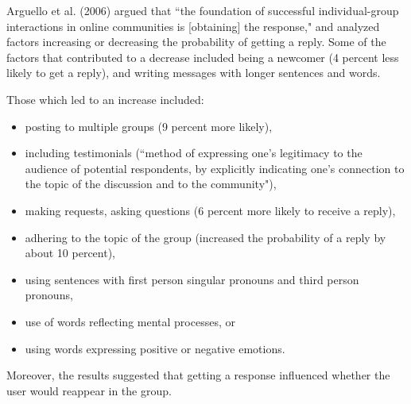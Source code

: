 \documentclass[10pt,dvipsnames]{scrartcl}
\begin{document}
Arguello et al. (2006) argued that ``the foundation of successful
individual-group interactions in online communities is {[}obtaining{]}
the response," and analyzed factors increasing or decreasing the
probability of getting a reply. Some of the factors that contributed to
a decrease included being a newcomer (4 percent less likely to get a
reply), and writing messages with longer sentences and words.

Those which led to an increase included:

\begin{itemize}
    \item posting to multiple groups (9 percent more likely), 
    \item including testimonials (``method of expressing one's legitimacy to the audience of potential respondents, by explicitly indicating one's connection to the topic of the discussion and to the community"), 
    \item making requests, asking questions (6 percent more likely to receive a reply),
    \item adhering to the topic of the group (increased the probability of a reply by about 10 percent),
    \item using sentences with first person singular pronouns and third person pronouns,
    \item use of words reflecting mental processes, or
    \item using words expressing positive or negative emotions.
\end{itemize}

Moreover, the results suggested that getting a response influenced
whether the user would reappear in the group.
\end{document}
